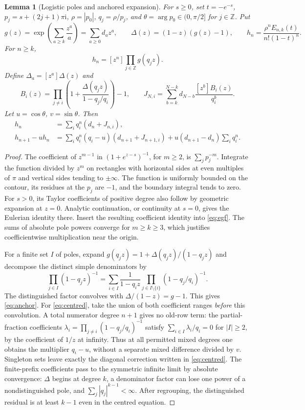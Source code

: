 \documentclass[11pt,reqno]{amsart}
\newtheorem{lemma}[theorem]{Lemma}
\theoremstyle{remark}
\newcommand{\iu}{\mathrm{i}}
\begin{document}
\begin{lemma}[Logistic poles and anchored expansion]\label{lem:poles}
For $s\ge0$, set $t=-e^{-s}$, $p_j=s+(2j+1)\pi\iu$, $\rho=|p_0|$, $q_j=\rho/p_j$, and $\theta=\arg p_0\in(0,\pi/2]$ for $j\in\mathbb Z$. Put
\[
 g(z)=\exp\left(\sum_{a\ge k}\frac{z^a}{a}\right)=\sum_{a\ge0}d_a z^a,\qquad
 \Delta(z)=(1-z)(g(z)-1),\qquad h_n=\frac{\rho^n E_{n,k}(t)}{n!(1-t)^n}.
\]
For $n\ge k$,
\begin{equation}\label{eq:poles}
 h_n=[z^n]\prod_{j\in\mathbb Z}g(q_j z).
\end{equation}
Define $\Delta_a=[z^a]\Delta(z)$ and
\[
 B_i(z)=\prod_{j\ne i}\left(1+\frac{\Delta(q_jz)}{1-q_j/q_i}\right)-1,\qquad
 J_{N,i}=\sum_{b=k}^{N-k}d_{N-b}\frac{[z^b]B_i(z)}{q_i^b}.
\]
Let $u=\cos\theta$, $v=\sin\theta$. Then
\begin{align}
 h_n&=\sum_i q_i^n(d_n+J_{n,i}), \label{eq:anchor}\\
 h_{n+1}-u h_n
   &=\sum_i q_i^n(q_i-u)(d_{n+1}+J_{n+1,i})
       +u(d_{n+1}-d_n)\sum_iq_i^n. \label{eq:centred}
\end{align}
\end{lemma}
\begin{proof}
The coefficient of $z^{m-1}$ in $(1+e^{z-s})^{-1}$, for $m\ge2$, is $\sum_jp_j^{-m}$. Integrate the function divided by $z^m$ on rectangles with horizontal sides at even multiples of $\pi$ and vertical sides tending to $\pm\infty$. The function is uniformly bounded on the contour, its residues at the $p_j$ are $-1$, and the boundary integral tends to zero. For $s>0$, its Taylor coefficients of positive degree also follow by geometric expansion at $z=0$. Analytic continuation, or continuity at $s=0$, gives the Eulerian identity there. Insert the resulting coefficient identity into \eqref{eq:egf}. The sums of absolute pole powers converge for $m\ge k\ge3$, which justifies coefficientwise multiplication near the origin.

For a finite set $I$ of poles, expand $g(q_jz)=1+\Delta(q_jz)/(1-q_jz)$ and decompose the distinct simple denominators by
\[
 \prod_{j\in I}(1-q_jz)^{-1}=\sum_{i\in I}
    \frac{1}{1-q_i z}\prod_{j\in I\setminus\{i\}}(1-q_j/q_i)^{-1}.
\]
The distinguished factor convolves with $\Delta/(1-z)=g-1$. This gives \eqref{eq:anchor}. For \eqref{eq:centred}, take the union of both coefficient ranges \emph{before} this convolution. A total numerator degree $n+1$ gives no old-row term: the partial-fraction coefficients $\lambda_i=\prod_{j\ne i}(1-q_j/q_i)^{-1}$ satisfy $\sum_{i\in I}\lambda_i/q_i=0$ for $|I|\ge2$, by the coefficient of $1/z$ at infinity. Thus at all permitted mixed degrees one obtains the multiplier $q_i-u$, without a separate mixed difference divided by $v$. Singleton sets leave exactly the diagonal correction written in \eqref{eq:centred}. The finite-prefix coefficients pass to the symmetric infinite limit by absolute convergence: $\Delta$ begins at degree $k$, a denominator factor can lose one power of a nondistinguished pole, and $\sum_j|q_j|^{k-1}<\infty$. After regrouping, the distinguished residual is at least $k-1$ even in the centred equation.
\end{proof}
\end{document}
